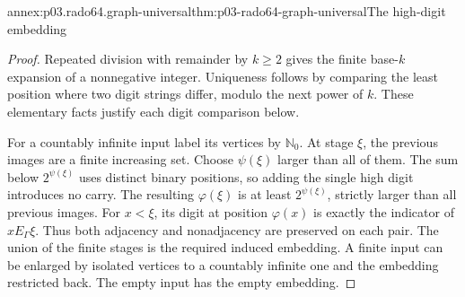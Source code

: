 \begin{annexitem}{annex:p03.rado64.graph-universal}{thm:p03-rado64-graph-universal}{The high-digit embedding}
\begin{proof}
Repeated division with remainder by \(k\geq2\) gives the finite base-\(k\)
expansion of a nonnegative integer. Uniqueness follows by comparing the
least position where two digit strings differ, modulo the next power of \(k\).
These elementary facts justify each digit comparison below.

For a countably infinite input label its vertices by \(\mathbb N_0\).
At stage \(\xi\), the previous images are a finite increasing set.
Choose \(\psi(\xi)\) larger than all of them. The sum below \(2^{\psi(\xi)}\)
uses distinct binary positions, so adding the single high digit introduces
no carry. The resulting \(\varphi(\xi)\) is at least \(2^{\psi(\xi)}\),
strictly larger than all previous images.
For \(x<\xi\), its digit at position \(\varphi(x)\) is exactly the
indicator of \(xE_\Gamma\xi\). Thus both adjacency and nonadjacency
are preserved on each pair. The union of the finite stages is the required
induced embedding.
A finite input can be enlarged by isolated vertices to a countably infinite
one and the embedding restricted back. The empty input has the empty
embedding.
\end{proof}
\end{annexitem}


